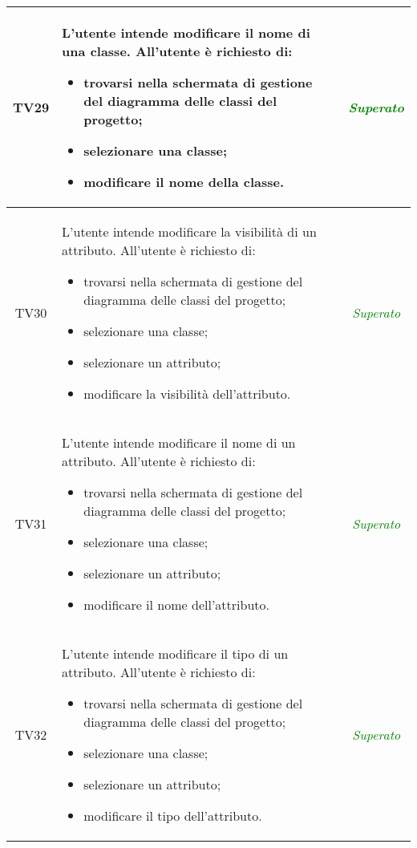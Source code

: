 \begin{longtable}{|c|>{}m{8cm}|c|}
\hypertarget{TV3.11.2}{TV29} & L'utente intende modificare il nome di una classe.
All'utente è richiesto di:
\begin{itemize}
	\item trovarsi nella schermata di gestione del diagramma delle classi del progetto;
	\item selezionare una classe;
	\item modificare il nome della classe.
\end{itemize} & \textcolor{Green}{\textit{Superato}}\\ \hline

\hypertarget{TV3.11.3.1}{TV30} & L'utente intende modificare la visibilità di un attributo.
All'utente è richiesto di:
\begin{itemize}
	\item trovarsi nella schermata di gestione del diagramma delle classi del progetto;
	\item selezionare una classe;
	\item selezionare un attributo;
	\item modificare la visibilità dell'attributo.
\end{itemize} & \textcolor{Green}{\textit{Superato}}\\ \hline

\hypertarget{TV3.11.3.2}{TV31} & L'utente intende modificare il nome di un attributo.
All'utente è richiesto di:
\begin{itemize}
	\item trovarsi nella schermata di gestione del diagramma delle classi del progetto;
	\item selezionare una classe;
	\item selezionare un attributo;
	\item modificare il nome dell'attributo.
\end{itemize} & \textcolor{Green}{\textit{Superato}}\\ \hline

\hypertarget{TV3.11.3.3}{TV32} & L'utente intende modificare il tipo di un attributo.
All'utente è richiesto di:
\begin{itemize}
	\item trovarsi nella schermata di gestione del diagramma delle classi del progetto;
	\item selezionare una classe;
	\item selezionare un attributo;
	\item modificare il tipo dell'attributo.
\end{itemize} & \textcolor{Green}{\textit{Superato}}\\ \hline


\end{longtable}

